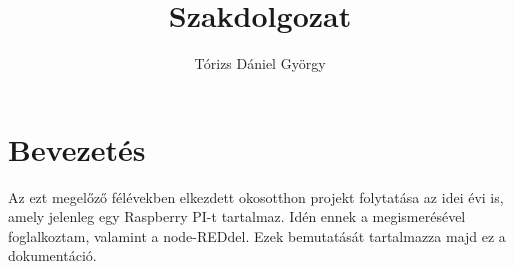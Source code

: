 \documentclass[a4paper,12pt,oneside]{report}
\begin{document}
\pagestyle{fancy}
\fancyhead[]{}
\fancyhead[C]{\thepage}
\fancyfoot[]{}
\fancyfoot[]{}
\renewcommand{\headrulewidth}{0pt}
\renewcommand{\footrulewidth}{0pt}




\title{Szakdolgozat}

\author{Tórizs Dániel György}

\date{}

\maketitle

\tableofcontents

\chapter{Bevezetés}

Az ezt megelőző félévekben elkezdett okosotthon projekt folytatása az idei évi is, amely jelenleg egy Raspberry PI-t tartalmaz.
Idén ennek a megismerésével foglalkoztam, valamint a node-REDdel. Ezek bemutatását tartalmazza majd ez a dokumentáció.



\end{document}

